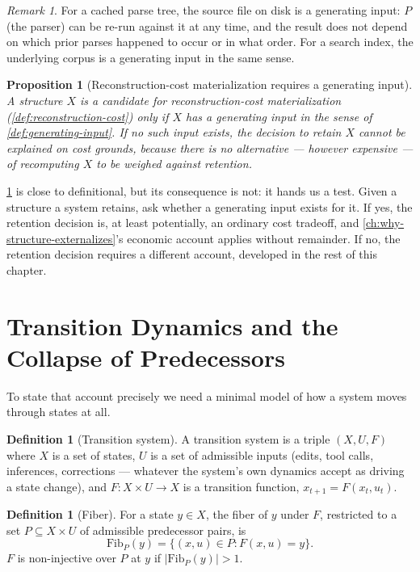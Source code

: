 \documentclass[11pt]{book}
\theoremstyle{plain}
\newtheorem{proposition}[theorem]{Proposition}
\theoremstyle{definition}
\newtheorem{definition}[theorem]{Definition}
\theoremstyle{remark}
\newtheorem{remark}[theorem]{Remark}
\begin{document}
\begin{remark}
For a cached parse tree, the source file on disk is a generating
input: $P$ (the parser) can be re-run against it at any time, and the
result does not depend on which prior parses happened to occur or in
what order. For a search index, the underlying corpus is a generating
input in the same sense.
\end{remark}

\begin{proposition}[Reconstruction-cost materialization requires a generating input]
\label{prop:reconstruction-requires-input}
A structure $X$ is a candidate for reconstruction-cost materialization
(\cref{def:reconstruction-cost}) only if $X$ has a generating input in
the sense of \cref{def:generating-input}. If no such input exists, the
decision to retain $X$ cannot be explained on cost grounds, because
there is no alternative --- however expensive --- of recomputing $X$
to be weighed against retention.
\end{proposition}

\cref{prop:reconstruction-requires-input} is close to definitional,
but its consequence is not: it hands us a test. Given a structure a
system retains, ask whether a generating input exists for it. If yes,
the retention decision is, at least potentially, an ordinary cost
tradeoff, and \cref{ch:why-structure-externalizes}'s economic account
applies without remainder. If no, the retention decision requires a
different account, developed in the rest of this chapter.

\section{Transition Dynamics and the Collapse of Predecessors}
\label{sec:transition-dynamics}

To state that account precisely we need a minimal model of how a
system moves through states at all.

\begin{definition}[Transition system]
\label{def:transition-system}
A transition system is a triple $(X, U, F)$ where $X$ is a set of
states, $U$ is a set of admissible inputs (edits, tool calls,
inferences, corrections --- whatever the system's own dynamics accept
as driving a state change), and $F : X \times U \to X$ is a transition
function, $x_{t+1} = F(x_t, u_t)$.
\end{definition}

\begin{definition}[Fiber]
\label{def:fiber}
For a state $y \in X$, the fiber of $y$ under $F$, restricted to a set
$P \subseteq X \times U$ of admissible predecessor pairs, is
\[
\mathrm{Fib}_P(y) = \{ (x, u) \in P : F(x, u) = y \}.
\]
$F$ is non-injective over $P$ at $y$ if $|\mathrm{Fib}_P(y)| > 1$.
\end{definition}
\end{document}

